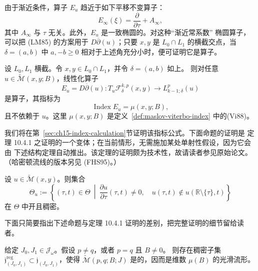 由于渐近条件，算子 $E_u$ 趋近于如下平移不变算子：
\[
 E_\infty(\xi)=\frac\partial{\partial\tau}+A_\infty,
\]
其中 $A_\infty$ 与 $\tau$ 无关。此外，$E_u$ 是一致椭圆的。对这种“渐近常系数”
椭圆算子，可以把 (LM85) 的方案用于 $D\overline\partial(u)$；只要 $x,y$ 是
$L_0\cap L_1$ 的横截交点，当 $\delta=(a,b)$ 中 $a,-b\geq0$ 相对于上述\personLagrange{}角充分小时，便可证明它是\personFredholm{}算子。

\begin{theorem}
\label{thm:linearized-floer-fredholm-index}
设 $L_0,L_1$ 横截。令 $x,y\in L_0\cap L_1$，并令 $\delta=(a,b)$ 如上。
则对任意 $u\in\widetilde{\mathcal M}(x,y;B)$，线性化算子
\[
 E_u=D\overline\partial(u):T_u\mathcal F_\delta^{k,p}(x,y)
 \longrightarrow L^p_{k-1;\delta}(u)
\]
是\personFredholm{}算子，其指标为
\[
 \operatorname{Index}E_u=\mu(x,y;B),
\]
且不依赖于 $u$。这里 $\mu(x,y;B)$ 是定义~\ref{def:maslov-viterbo-index}
中的\termMaslovViterboIndex{}(Vi88)。
\end{theorem}

我们将在第~\ref{sec:ch15-index-calculation}节证明该指标公式。下面命题的证明是
定理 10.4.1 之证明的一个变体；在当前情形，无需施加某处单射性假设，因为它会由
下述结构定理自动推出。该定理的证明颇为技术性，故请读者参见原始论文。（哈密顿\personFloer{}流线的版本另见 (FHS95)。）

\begin{lemma}[（(Oh97a) 的定理 5.1）]
\label{lem:somewhere-injective-floer-strip}
设 $u\in\widetilde{\mathcal M}(x,y)$。则集合
\[
 \Theta_u:=\left\{(\tau,t)\in\Theta\ \middle|\
 \frac{\partial u}{\partial\tau}(\tau,t)\neq0,
 \quad u(\tau,t)\notin u(\mathbb R\setminus\{\tau\},t)\right\}
\]
在 $\Theta$ 中开且稠密。
\end{lemma}

下面只简要指出下述命题与定理 10.4.1 证明的差别，把完整证明的细节留给读者。

\begin{proposition}
\label{prop:generic-floer-regularity-ch15}
给定 $J_0,J_1\in\mathcal J_\omega$。假设 $p\neq q$，或者 $p=q$ 且 $B\neq0$。
则存在稠密子集
$\mathfrak j^{\mathrm{reg}}_{(J_0,J_1)}\subset\mathfrak j_{(J_0,J_1)}$，使得
$\widetilde{\mathcal M}(p,q;B;J)$ 是\termFredholmRegularity{}的，因而是维数
$\mu(B)$ 的光滑流形。
\end{proposition}

